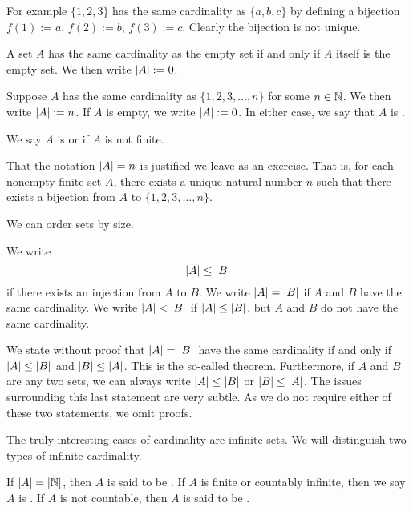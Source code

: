 For example $\{ 1,2,3 \}$ has the same cardinality as $\{ a,b,c \}$ by
defining a bijection $f(1) := a$, $f(2) := b$, $f(3) := c$.  Clearly the
bijection is not unique.

A set $A$ has the same cardinality as the empty set if and only
if $A$ itself is the empty set.  We then write $\left\lvert {A} \right\rvert := 0$.

\begin{defn}
Suppose $A$ has the same cardinality as $\{ 1,2,3,\ldots,n \}$
for some $n \in {\mathbb{N}}$.
We then write $\left\lvert {A} \right\rvert := n$.  If $A$ is empty, we write $\left\lvert {A} \right\rvert := 0$.
In either case, we say that $A$ is
\emph{}.

We say $A$ is \emph{} or 
if $A$ is not finite.
\end{defn}

That the notation $\left\lvert {A} \right\rvert = n$ is justified we leave as an exercise.  That
is, for each nonempty finite set $A$, there exists a unique natural number
$n$ such that there exists a bijection from $A$ to $\{ 1,2,3,\ldots,n \}$.

We can order sets by size.

\begin{defn} \label{def:comparecards}
We write
\begin{equation*}
\left\lvert {A} \right\rvert \leq \left\lvert {B} \right\rvert
\end{equation*}
if there exists an injection from $A$ to $B$.  We write $\left\lvert {A} \right\rvert = \left\lvert {B} \right\rvert$
if $A$ and $B$ have the same cardinality.  We write $\left\lvert {A} \right\rvert < \left\lvert {B} \right\rvert$
if $\left\lvert {A} \right\rvert \leq \left\lvert {B} \right\rvert$, but $A$ and $B$ do not have the same cardinality.
\end{defn}

We state without proof that
$\left\lvert {A} \right\rvert = \left\lvert {B} \right\rvert$ have the same cardinality if and only if
$\left\lvert {A} \right\rvert \leq \left\lvert {B} \right\rvert$ and
$\left\lvert {B} \right\rvert \leq \left\lvert {A} \right\rvert$.  This is the so-called
 theorem.
Furthermore, if $A$ and $B$ are any two sets,
we can always write $\left\lvert {A} \right\rvert \leq \left\lvert {B} \right\rvert$ or
$\left\lvert {B} \right\rvert \leq \left\lvert {A} \right\rvert$.  The issues surrounding this
last statement are very subtle.  As we do not require either
of these two statements, we omit proofs.

The truly interesting cases of cardinality are infinite sets.
We will distinguish two types of infinite cardinality.

\begin{defn}
If $\left\lvert {A} \right\rvert = \left\lvert {{\mathbb{N}}} \right\rvert$, then $A$ is said to be
\emph{}.
If $A$ is finite or countably infinite, then we say $A$
is \emph{}.
If $A$ is not countable, then
$A$ is said to be \emph{}.
\end{defn}

